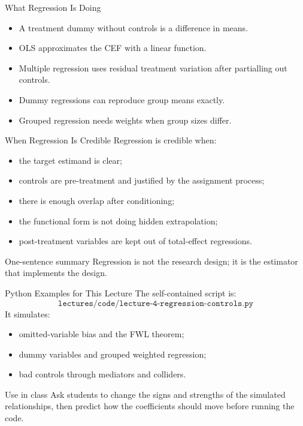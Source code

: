 \documentclass[11pt,aspectratio=169]{beamer}
\begin{document}
\begin{frame}{What Regression Is Doing}
  \begin{itemize}
    \item A treatment dummy without controls is a difference in means.
    \item OLS approximates the CEF with a linear function.
    \item Multiple regression uses residual treatment variation after partialling out controls.
    \item Dummy regressions can reproduce group means exactly.
    \item Grouped regression needs weights when group sizes differ.
  \end{itemize}
\end{frame}

\begin{frame}{When Regression Is Credible}
  Regression is credible when:
  \begin{itemize}
    \item the target estimand is clear;
    \item controls are pre-treatment and justified by the assignment process;
    \item there is enough overlap after conditioning;
    \item the functional form is not doing hidden extrapolation;
    \item post-treatment variables are kept out of total-effect regressions.
  \end{itemize}
  \begin{block}{One-sentence summary}
    Regression is not the research design; it is the estimator that implements the design.
  \end{block}
\end{frame}

\begin{frame}{Python Examples for This Lecture}
  The self-contained script is:
  \[
    \texttt{lectures/code/lecture-4-regression-controls.py}
  \]
  It simulates:
  \begin{itemize}
    \item omitted-variable bias and the FWL theorem;
    \item dummy variables and grouped weighted regression;
    \item bad controls through mediators and colliders.
  \end{itemize}
  \begin{block}{Use in class}
    Ask students to change the signs and strengths of the simulated relationships, then predict how the coefficients should move before running the code.
  \end{block}
\end{frame}
\end{document}
